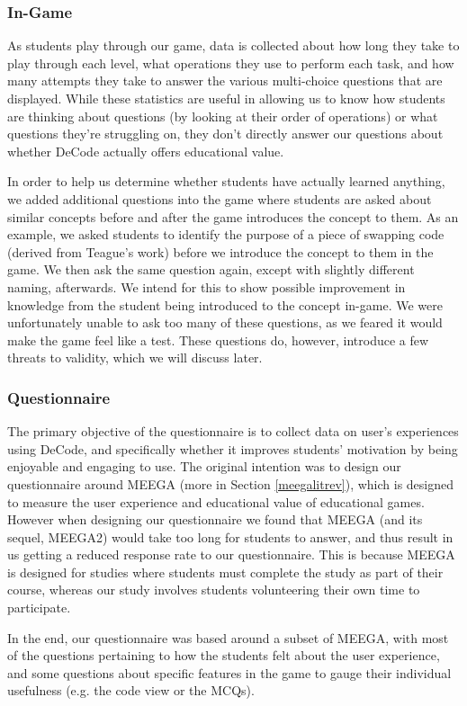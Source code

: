\documentclass[10pt]{article}
\begin{document}
\subsubsection{In-Game}
As students play through our game, data is collected about how long they take to play through each level, what operations they use to perform each task, and how many attempts they take to answer the various multi-choice questions that are displayed. While these statistics are useful in allowing us to know how students are thinking about questions (by looking at their order of operations) or what questions they're struggling on, they don't directly answer our questions about whether DeCode actually offers educational value.\par
In order to help us determine whether students have actually learned anything, we added additional questions into the game where students are asked about similar concepts before and after the game introduces the concept to them. As an example, we asked students to identify the purpose of a piece of swapping code (derived from Teague's work\cite{Teague:2012:SHW:2483716.2483727}) before we introduce the concept to them in the game. We then ask the same question again, except with slightly different naming, afterwards. We intend for this to show possible improvement in knowledge from the student being introduced to the concept in-game. We were unfortunately unable to ask too many of these questions, as we feared it would make the game feel like a test. These questions do, however, introduce a few threats to validity, which we will discuss later.
\subsubsection{Questionnaire}
The primary objective of the questionnaire is to collect data on user's experiences using DeCode, and specifically whether it improves students' motivation by being enjoyable and engaging to use. The original intention was to design our questionnaire around MEEGA\cite{Rafael}\cite{meegaPlus} (more in Section \ref{meegalitrev}), which is designed to measure the user experience and educational value of educational games. However when designing our questionnaire we found that MEEGA (and its sequel, MEEGA2) would take too long for students to answer, and thus result in us getting a reduced response rate to our questionnaire. This is because MEEGA is designed for studies where students must complete the study as part of their course, whereas our study involves students volunteering their own time to participate.\par
In the end, our questionnaire was based around a subset of MEEGA, with most of the questions pertaining to how the students felt about the user experience, and some questions about specific features in the game to gauge their individual usefulness (e.g. the code view or the MCQs).
\end{document}
